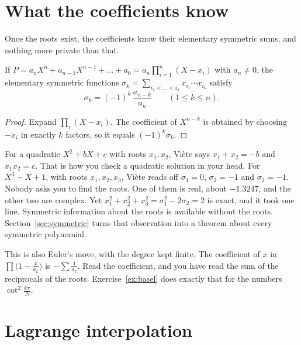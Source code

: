 
\section{What the coefficients know}

Once the roots exist, the coefficients know their elementary symmetric sums, and nothing more private than that.

\begin{proposition}\label{prop:viete}
If $P=a_nX^n+a_{n-1}X^{n-1}+\dots+a_0=a_n\prod_{i=1}^n(X-x_i)$ with $a_n\ne0$, the elementary symmetric functions $\sigma_k=\sum_{i_1<\dots<i_k}x_{i_1}\cdots x_{i_k}$ satisfy
\[
\sigma_k=(-1)^k\,\frac{a_{n-k}}{a_n}\qquad(1\le k\le n).
\]
\end{proposition}
\begin{proof}
Expand $\prod_i(X-x_i)$. The coefficient of $X^{n-k}$ is obtained by choosing $-x_i$ in exactly $k$ factors, so it equals $(-1)^k\sigma_k$.
\end{proof}

\begin{examplex}
For a quadratic $X^2+bX+c$ with roots $x_1,x_2$, Vi\`ete says $x_1+x_2=-b$ and $x_1x_2=c$. That is how you check a quadratic solution in your head. For $X^3-X+1$, with roots $x_1,x_2,x_3$, Vi\`ete reads off $\sigma_1=0$, $\sigma_2=-1$ and $\sigma_3=-1$. Nobody asks you to find the roots. One of them is real, about $-1.3247$, and the other two are complex. Yet $x_1^2+x_2^2+x_3^2=\sigma_1^2-2\sigma_2=2$ is exact, and it took one line. Symmetric information about the roots is available without the roots. Section~\ref{sec:symmetric} turns that observation into a theorem about every symmetric polynomial.
\end{examplex}

This is also Euler's move, with the degree kept finite. The coefficient of $x$ in $\prod\bigl(1-\frac x{a_k}\bigr)$ is $-\sum\frac1{a_k}$. Read the coefficient, and you have read the sum of the reciprocals of the roots. Exercise~\ref{ex:basel} does exactly that for the numbers $\cot^2\frac{k\pi}N$.

\section{Lagrange interpolation}

